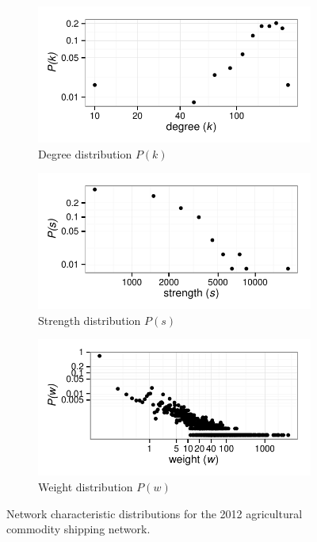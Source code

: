 \documentclass[12pt]{article}
\begin{document}
\begin{figure}[h]
	\centering
	\begin{subfigure}[b]{0.5\textwidth}
		\centering
        	\includegraphics[width=\textwidth]{degree_dist.pdf}
        	\caption{Degree distribution $P(k)$}
        	\label{fig:degree dist}
	\end{subfigure}
	\hfill
	\begin{subfigure}[b]{0.5\textwidth}
		\centering
        	\includegraphics[width=\textwidth]{strength_dist.pdf}
        	\caption{Strength distribution $P(s)$}
        	\label{fig:strength dist}
	\end{subfigure}
	\hfill
	\begin{subfigure}[b]{0.5\textwidth}
		\centering
    		\includegraphics[width=\textwidth]{weight_dist.pdf}
   		\caption{Weight distribution $P(w)$}
        	\label{fig:weight dist}
	\end{subfigure}
	\caption{Network characteristic distributions for the 2012 agricultural commodity shipping network.}
	\label{fig:distributions}
\end{figure}
		
\end{document}
